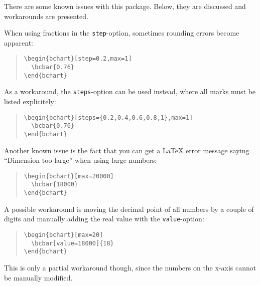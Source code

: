 \documentclass{article}
\begin{document}
There are some known issues with this package. Below, they are discussed and workarounds are presented.

When using fractions in the \texttt{step}-option, sometimes rounding errors become apparent:
\begin{quote}\small
\begin{verbatim}
\begin{bchart}[step=0.2,max=1]
  \bcbar{0.76}
\end{bchart}
\end{verbatim}
\end{quote}
\begin{quote}
\begin{bchart}[step=0.2,max=1]
\end{bchart}
\end{quote}
As a workaround, the \texttt{steps}-option can be used instead, where all marks must be listed explicitely:
\begin{quote}\small
\begin{verbatim}
\begin{bchart}[steps={0.2,0.4,0.6,0.8,1},max=1]
  \bcbar{0.76}
\end{bchart}
\end{verbatim}
\end{quote}
\begin{quote}
\begin{bchart}[steps={0.2,0.4,0.6,0.8,1},max=1]
\end{bchart}
\end{quote}

Another known issue is the fact that you can get a \LaTeX{} error message saying ``Dimension too large'' when using large numbers:
\begin{quote}\small
\begin{verbatim}
\begin{bchart}[max=20000]
  \bcbar{18000}
\end{bchart}
\end{verbatim}
\end{quote}
A possible workaround is moving the decimal point of all numbers by a couple of digits and manually adding the real value with the \texttt{value}-option:
\begin{quote}\small
\begin{verbatim}
\begin{bchart}[max=20]
  \bcbar[value=18000]{18}
\end{bchart}
\end{verbatim}
\end{quote}
\begin{quote}
\begin{bchart}[max=20]
\end{bchart}
\end{quote}
This is only a partial workaround though, since the numbers on the x-axis cannot be manually modified.
\end{document}
